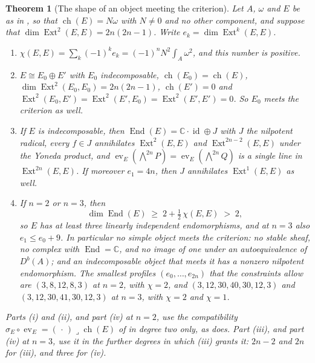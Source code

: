 \documentclass[11pt,reqno]{amsart}
\theoremstyle{plain}
\newtheorem{theorem}{Theorem}[section]
\theoremstyle{definition}
\theoremstyle{remark}
\newcommand{\CC}{\mathbb{C}}
\DeclareMathOperator{\ch}{ch}
\DeclareMathOperator{\End}{End}
\DeclareMathOperator{\Ext}{Ext}
\DeclareMathOperator{\id}{id}
\begin{document}
\begin{theorem}[The shape of an object meeting the criterion]
\label{thm:p2endo}
Let $A$, $\omega$ and $E$ be as in , so that
$\ch(E)=N\omega$ with $N\ne0$ and no other component, and suppose that
$\dim\Ext^{2}(E,E)=2n(2n-1)$. Write $e_{k}=\dim\Ext^{k}(E,E)$.
\begin{enumerate}[label=\textup{(\roman*)},leftmargin=2.6em,itemsep=2pt]
\item $\chi(E,E)=\sum_{k}(-1)^{k}e_{k}=(-1)^{n}N^{2}\int_{A}\omega^{2}$, and
  this number is positive.
\item $E\cong E_{0}\oplus E'$ with $E_{0}$ indecomposable,
  $\ch(E_{0})=\ch(E)$, $\dim\Ext^{2}(E_{0},E_{0})=2n(2n-1)$, $\ch(E')=0$ and
  $\Ext^{2}(E_{0},E')=\Ext^{2}(E',E_{0})=\Ext^{2}(E',E')=0$. So $E_{0}$ meets
  the criterion as well.
\item If $E$ is indecomposable, then $\End(E)=\CC\cdot\id\oplus J$ with $J$
  the nilpotent radical, every $f\in J$ annihilates $\Ext^{2}(E,E)$ and
  $\Ext^{2n-2}(E,E)$ under the Yoneda product, and
  $\operatorname{ev}_{E}(\bigwedge^{2n}P)=\operatorname{ev}_{E}(\bigwedge^{2n}Q)$
  is a single line in $\Ext^{2n}(E,E)$. If moreover $e_{1}=4n$, then $J$
  annihilates $\Ext^{1}(E,E)$ as well.
\item If $n=2$ or $n=3$, then
  \[
    \dim\End(E)\;\ge\;2+\tfrac12\,\chi(E,E)\;>\;2,
  \]
  so $E$ has at least three linearly independent endomorphisms, and at
  $n=3$ also $e_{1}\le e_{0}+9$. In particular no simple object meets the
  criterion: no stable sheaf, no complex with $\End=\CC$, and no image of one
  under an autoequivalence of $D^{b}(A)$; and an indecomposable object that
  meets it has a nonzero nilpotent endomorphism. The smallest profiles
  $(e_{0},\dots,e_{2n})$ that the constraints allow are $(3,8,12,8,3)$ at
  $n=2$, with $\chi=2$, and $(3,12,30,40,30,12,3)$ and $(3,12,30,41,30,12,3)$
  at $n=3$, with $\chi=2$ and $\chi=1$.
\end{enumerate}
Parts (i) and (ii), and part (iv) at $n=2$, use the compatibility
$\sigma_{E}\circ\operatorname{ev}_{E}=(\,\cdot\,)\lrcorner\ch(E)$ of
 in degree two only, as  does. Part
(iii), and part (iv) at $n=3$, use it in the further degrees in which
(iii) grants it: $2n-2$ and $2n$ for (iii), and three for
(iv).
\end{theorem}
\end{document}
